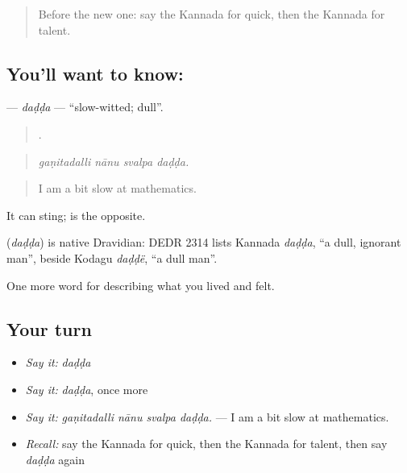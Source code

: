 \label{lesson:KA-C503-dadda}



\begin{quote}
Before the new one: say the Kannada for quick, then the Kannada for talent.
\end{quote}

\subsection*{You'll want to know: }
\textbf{} — \emph{daḍḍa} — \textquotedblleft{}slow-witted; dull\textquotedblright{}.

\begin{quote}
   .
\end{quote}

\begin{quote}
\emph{gaṇitadalli nānu svalpa daḍḍa.}
\end{quote}

\begin{quote}
I am a bit slow at mathematics.
\end{quote}

It can sting;  is the opposite.

\begin{cousinweb}
\textbf{} (\emph{daḍḍa}) is native Dravidian: DEDR 2314 lists Kannada \emph{daḍḍa}, \textquotedblleft{}a dull, ignorant man\textquotedblright{}, beside Kodagu \emph{daḍḍë}, \textquotedblleft{}a dull man\textquotedblright{}.
\end{cousinweb}

\begin{grammarlens}[title={What you've built}]
One more word for describing what you lived and felt.
\end{grammarlens}

\subsection*{Your turn}
\begin{itemize}
\raggedright
  \item \emph{Say it:} \emph{daḍḍa}
  \item \emph{Say it:} \emph{daḍḍa}, once more
  \item \emph{Say it:} \emph{gaṇitadalli nānu svalpa daḍḍa.} — I am a bit slow at mathematics.
  \item \emph{Recall:} say the Kannada for quick, then the Kannada for talent, then say \emph{daḍḍa} again
\end{itemize}

